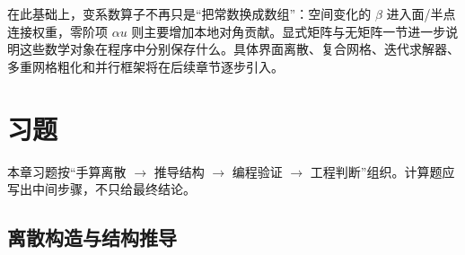 在此基础上，变系数算子不再只是“把常数换成数组”：空间变化的 $\beta$ 进入面/半点连接权重，零阶项 $\alpha u$ 则主要增加本地对角贡献。显式矩阵与无矩阵一节进一步说明这些数学对象在程序中分别保存什么。具体界面离散、复合网格、迭代求解器、多重网格粗化和并行框架将在后续章节逐步引入。

\section*{习题}

本章习题按“手算离散 $\rightarrow$ 推导结构 $\rightarrow$ 编程验证 $\rightarrow$ 工程判断”组织。计算题应写出中间步骤，不只给最终结论。

\subsection*{离散构造与结构推导}
